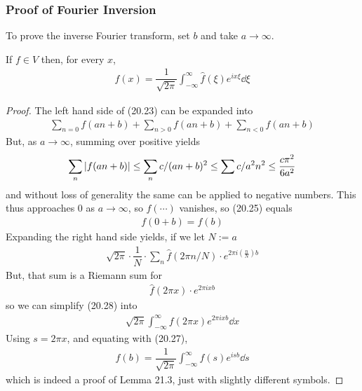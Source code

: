 \subsubsection{Proof of Fourier Inversion}
To prove the inverse Fourier transform, set $b$ and take $a \to \infty$.
\begin{lemma}
    If $f \in V$ then, for every $x$,
    \begin{align}
        \boxed{f(x) = \dfrac{1}{\sqrt{2\pi}} \int_{-\infty}^\infty \hat{f}(\xi) e^{ix\xi} \dd{\xi}}
    \end{align}
\end{lemma}
\begin{proof}
    The left hand side of (20.23) can be expanded into
    \begin{align}
        \sum_{n=0} f(an+b) + \sum_{n>0} f(an+b) + \sum_{n<0} f(an+b)
    \end{align}
    But, as $a \to\infty$, summing over positive yields
    \begin{align}
        \sum_n \abs{f(an+b)} \le \sum_n c/(an+b)^2 \le \sum c/a^2n^2 \le \dfrac{c\pi^2}{6a^2}
    \end{align}
    and without loss of generality the same can be applied to negative numbers. This thus approaches $0$ as $a \to \infty$, so $f(\cdots)$ vanishes, so (20.25) equals
    \begin{align}
        f(0 + b) = \boxed{f(b)}
    \end{align}
    Expanding the right hand side yields, if we let $N := a$
    \begin{align}
        \sqrt{2\pi} \cdot \dfrac{1}{N} \cdot \sum_n \hat{f}(2\pi n/N) \cdot e^{2\pi i (\frac{n}{N}) b}
    \end{align}
    But, that sum is a Riemann sum for
    \begin{align}
        \hat{f}(2\pi x) \cdot e^{2\pi i x b}
    \end{align}
    so we can simplify (20.28) into
    \begin{align}
        \sqrt{2\pi} \int_{-\infty}^\infty f(2\pi x) e^{2\pi ix b} \dd{x}
    \end{align}
    Using $s = 2\pi x$, and equating with (20.27),
    \begin{align}
        f(b) = \dfrac{1}{\sqrt{2\pi}} \int_{-\infty}^\infty f(s) e^{isb} \dd{s}
    \end{align}
    which is indeed a proof of Lemma 21.3, just with slightly different symbols.
\end{proof}

